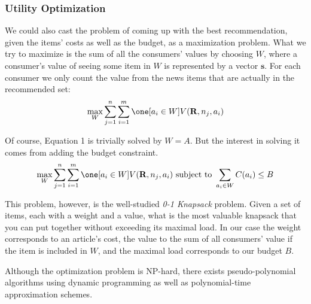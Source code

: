 \documentclass{article}
\begin{document}
\subsubsection{Utility Optimization}
We could also cast the problem of coming up with the best recommendation, given the items' costs as well as the budget, as a maximization problem. What we try to maximize is the sum of all the consumers' values by choosing $W$, where a consumer's value of seeing some item in $W$ is represented by a vector $\boldsymbol{s}$. For each consumer we only count the value from the news items that are actually in the recommended set:\\
\begin{equation}
\max_W \sum_{j=1}^n \sum_{i=1}^m \one [a_i\in W] V(\mathbf{R}, n_j, a_i)
\end{equation}

Of course, Equation 1 is trivially solved by $W=A$. But the interest in solving it comes from adding the budget constraint.
\begin{equation}
\max_W \sum_{j=1}^n \sum_{i=1}^m \one [a_i\in W] V(\mathbf{R}, n_j, a_i) \text{ subject to } \sum_{a_i \in W} C(a_i) \leq B
\end{equation}

This problem, however, is the well-studied {\em 0-1 Knapsack} problem. Given a set of items, each with a weight and a value, what is the most valuable knapsack that you can put together without exceeding its maximal load. In our case the weight corresponds to an article's cost, the value to the sum of all consumers' value if the item is included in $W$, and the maximal load corresponds to our budget $B$. 

Although the optimization problem is NP-hard, there exists pseudo-polynomial algorithms using dynamic programming as well as polynomial-time approximation schemes.


\end{document}
